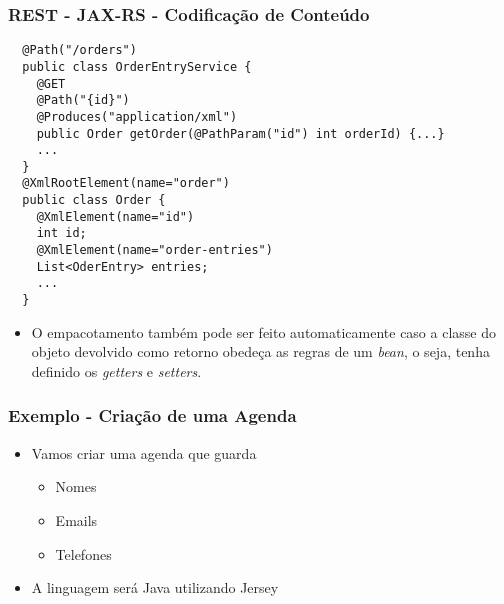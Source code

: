 \documentclass[Ligatures=TeX,table,brazil,svgnames,usetotalslideindicator,comp
ress,10pt]{beamer}
\begin{document}
\begin{frame}[fragile]
  \frametitle{REST - JAX-RS - Codificação de Conteúdo}

{\footnotesize
\begin{verbatim}
  @Path("/orders")
  public class OrderEntryService {
    @GET
    @Path("{id}")
    @Produces("application/xml")
    public Order getOrder(@PathParam("id") int orderId) {...}
    ...
  }
  @XmlRootElement(name="order")
  public class Order {
    @XmlElement(name="id")
    int id;
    @XmlElement(name="order-entries")
    List<OderEntry> entries;
    ...
  }
\end{verbatim}
}

  \begin{itemize}
  \item O empacotamento também pode ser feito automaticamente caso a
    classe do objeto devolvido como retorno obedeça as regras de um
    \emph{bean}, o seja, tenha definido os \emph{getters} e
    \emph{setters}.
  \end{itemize}
\end{frame}


\begin{frame}
  \frametitle{Exemplo - Criação de uma Agenda}
  \begin{itemize}
  \item Vamos criar uma agenda que guarda
    \begin{itemize}
    \item Nomes
    \item Emails
    \item Telefones
    \end{itemize}
  \item A linguagem será Java utilizando Jersey
  \end{itemize}

\end{frame}
\end{document}
